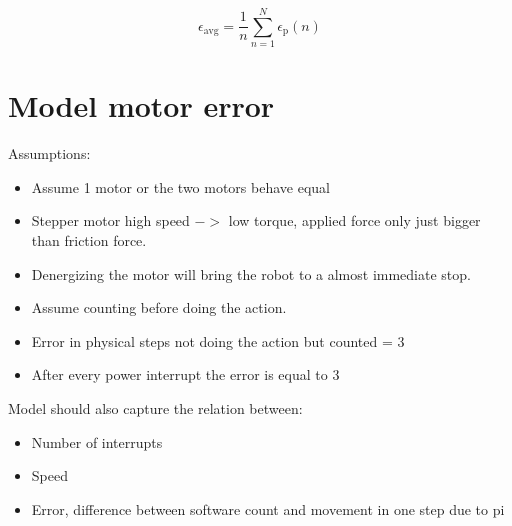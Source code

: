 \documentclass[11pt,twoside,a4paper]{article}
\begin{document}
\begin{equation}
\epsilon_{\text{avg}} = \frac{1}{n}\sum_{n=1}^{N} \epsilon_{\text{p}}(n) 
\end{equation}


\section{Model motor error}

Assumptions: \\
\begin{itemize}
\item Assume 1 motor or the two motors behave equal
\item Stepper motor high speed $->$ low torque, applied force only just bigger than friction force.
\item Denergizing the motor will bring the robot to a almost immediate stop.
\item Assume counting before doing the action.
\item Error in physical steps not doing the action but counted = 3
\item After every power interrupt the error is equal to 3
\end{itemize}

\noindent
Model should also capture the relation between: \\
\begin{itemize}
\item Number of interrupts
\item Speed
\item Error, difference between software count and movement in one step due to pi
\end{itemize}
\end{document}
